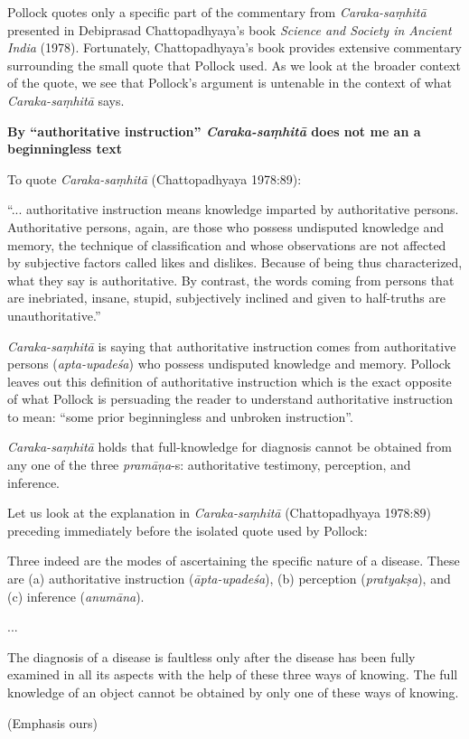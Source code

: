 \newpage

Pollock quotes only a specific part of the commentary from {\sl Caraka-saṃhitā} presented in Debiprasad Chattopadhyaya's book {\sl Science and Society in Ancient India} (1978).  Fortunately, Chattopadhyaya's book provides extensive commentary surrounding the small quote that Pollock used. As we look at the broader context of the quote, we see that Pollock's argument is untenable in the context of what {\sl Caraka-saṃhitā} says.

{\bf By ``authoritative instruction'' {{\sl\bfseries Caraka-saṃhitā}\relax} does not me	an a beginningless text}

To quote {\sl Caraka-saṃhitā} (Chattopadhyaya 1978:89):
\begin{myquote}
``... authoritative instruction means knowledge imparted by authoritative persons. Authoritative persons, again, are those who possess undisputed knowledge and memory, the technique of classification and whose observations are not affected by subjective factors called likes and dislikes. Because of being thus characterized, what they say is authoritative.  By contrast, the words coming from persons that are inebriated, insane, stupid, subjectively inclined and given to half-truths are unauthoritative.''
\end{myquote}

{\sl Caraka-saṃhitā} is saying that authoritative instruction comes from authoritative persons ({\sl apta-upadeśa}) who possess undisputed knowledge and memory. Pollock leaves out this definition of authoritative instruction which is the exact opposite of what Pollock is persuading the reader to understand authoritative instruction to mean: ``some prior beginningless and unbroken instruction''.

{\sl Caraka-saṃhitā} holds that full-knowledge for diagnosis cannot be obtained from any one of the three {\sl pramāṇa}-s: authoritative testimony, perception, and inference.

Let us look at the explanation in {\sl Caraka-saṃhitā} (Chattopadhyaya 1978:89) preceding immediately before the isolated quote used by Pollock:
\begin{myquote}
Three indeed are the modes of ascertaining the specific nature of a disease. These are (a) authoritative instruction ({\sl āpta-upadeśa}), (b) perception ({\sl pratyakṣa}), and (c) inference ({\sl anumāna}).

...

The diagnosis of a disease is faultless only after the disease has been fully examined in all its aspects with the help of these three ways of knowing. The full knowledge of an object cannot be obtained by only one of these ways of knowing.

\hfill (Emphasis ours)
\end{myquote}

